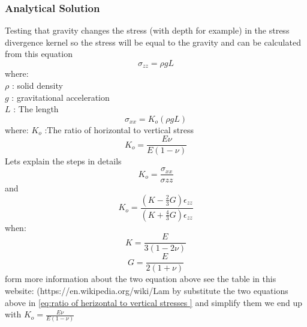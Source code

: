 \documentclass[]{scrreprt}
\begin{document}
\subsubsection{Analytical Solution}
Testing that gravity changes the stress (with depth for example) in the stress divergence kernel
so the stress will be equal to the gravity and can be calculated from this equation
\begin{equation}
\sigma_{zz}=\rho g L
\end{equation}
where: \\
$\rho$ : solid density\\
$g$ : gravitational acceleration \\
$L$ : The length \\
 \begin{equation}
 \sigma_{xx}= K_o(\rho g L) 
 \end{equation}
where:
$K_o$ :The ratio of horizontal to vertical stress 
\begin{equation}
K_o=\frac{E\nu}{E(1-\nu)}
\end{equation}
\ifshowallderivations
Lets explain the steps in details
\begin{equation}
K_o=\frac{\sigma_{xx}}{\sigma{zz}}
\end{equation}
and 
\begin{equation}
\label{eq:ratio of herizontal to vertical stresses }
K_o=\frac{ (K - \mbox{$\frac{2}{3}$}G)\epsilon_{zz}}{(K + \mbox{$\frac{4}{3}$}G)\epsilon_{zz}}
\end{equation}
when:\\
\begin{equation}
K=\frac{E}{3(1-2\nu)}
\end{equation}
\begin{equation}
G=\frac{E}{2(1+\nu)}
\end{equation}
form more information about the two equation above see the table in this website: (https://en.wikipedia.org/wiki/Lam%
by substitute the two equations above in \ref{eq:ratio of herizontal to vertical stresses } and simplify them we end up with 
$K_o=\frac{E\nu}{E(1-\nu)}$

\fi
\end{document}
